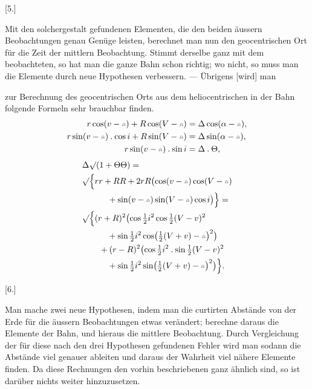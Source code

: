 \clearpage\begingroup{}
\begin{center}[5.]\end{center}
\noindent\hspace*{\parindent}Mit den solchergestalt gefundenen Elementen, die den beiden äussern Beobachtungen genau Genüge leisten, berechnet man nun den geocentrischen Ort für die Zeit der mittlern Beobachtung. Stimmt derselbe ganz mit dem beobachteten, so hat man die ganze Bahn schon richtig; wo nicht, so muss man die Elemente durch neue Hypothesen verbessern. — Übrigens [wird] man
\fancyfoot[R]{\small 29\textsuperscript{*}}
\par\clearpage
{}
\noindent zur Berechnung des geocentrischen Orts aus dem heliocentrischen in der Bahn folgende Formeln sehr brauchbar finden.
\[
\begin{aligned}
r\cos(v-\AstNode)+R\cos(V-\AstNode)&=\Delta\cos(\alpha-\AstNode),\\
r\sin(v-\AstNode)\mathbin{.}\cos i+R\sin(V-\AstNode)&=\Delta\sin(\alpha-\AstNode),\\
r\sin(v-\AstNode)\mathbin{.}\sin i&=\Delta\mathbin{.}\Theta,
\end{aligned}
\]
\[
\begin{aligned}
&\Delta\surd(1+\Theta\Theta)={}\\
&\surd\Bigl\{rr+RR+2rR\bigl(\cos(v-\AstNode)\cos(V-\AstNode)\\
&\hspace{3em}+\sin(v-\AstNode)\sin(V-\AstNode)\cos i\bigr)\Bigr\}={}\\
&\surd\Bigl\{(r+R)^2\bigl(\cos\tfrac12i^2\cos\tfrac12(V-v)^2\\
&\hspace{3em}+\sin\tfrac12i^2\cos\bigl(\tfrac12(V+v)-\AstNode\bigr)^2\bigr)\\
&\hspace{2em}+(r-R)^2\bigl(\cos\tfrac12i^2\mathbin{.}\sin\tfrac12(V-v)^2\\
&\hspace{3em}+\sin\tfrac12i^2\sin\bigl(\tfrac12(V+v)-\AstNode\bigr)^2\bigr)\Bigr\}.
\end{aligned}
\]
\begin{center}
[6.]\par\medskip
{}
\end{center}
\noindent{\small [S. 6]}\par
\noindent\hspace*{\parindent}Man mache zwei neue Hypothesen, indem man die curtirten Abstände von der Erde für die äussern Beobachtungen etwas verändert; berechne daraus die Elemente der Bahn, und hieraus die mittlere Beobachtung. Durch Vergleichung der für diese nach den drei Hypothesen gefundenen Fehler wird man sodann die Abstände viel genauer ableiten und daraus der Wahrheit viel nähere Elemente finden. Da diese Rechnungen den vorhin beschriebenen ganz ähnlich sind, so ist darüber nichts weiter hinzuzusetzen.
